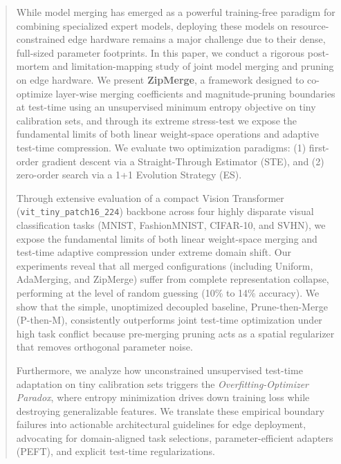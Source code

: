 \begin{abstract}
While model merging has emerged as a powerful training-free paradigm for combining specialized expert models, deploying these models on resource-constrained edge hardware remains a major challenge due to their dense, full-sized parameter footprints. In this paper, we conduct a rigorous post-mortem and limitation-mapping study of joint model merging and pruning on edge hardware. We present \textbf{ZipMerge}, a framework designed to co-optimize layer-wise merging coefficients and magnitude-pruning boundaries at test-time using an unsupervised minimum entropy objective on tiny calibration sets, and through its extreme stress-test we expose the fundamental limits of both linear weight-space operations and adaptive test-time compression. We evaluate two optimization paradigms: (1) first-order gradient descent via a Straight-Through Estimator (STE), and (2) zero-order search via a 1+1 Evolution Strategy (ES). 

Through extensive evaluation of a compact Vision Transformer (\texttt{vit\_tiny\_patch16\_224}) backbone across four highly disparate visual classification tasks (MNIST, FashionMNIST, CIFAR-10, and SVHN), we expose the fundamental limits of both linear weight-space merging and test-time adaptive compression under extreme domain shift. Our experiments reveal that all merged configurations (including Uniform, AdaMerging, and ZipMerge) suffer from complete representation collapse, performing at the level of random guessing (10\% to 14\% accuracy). We show that the simple, unoptimized decoupled baseline, Prune-then-Merge (P-then-M), consistently outperforms joint test-time optimization under high task conflict because pre-merging pruning acts as a spatial regularizer that removes orthogonal parameter noise. 

Furthermore, we analyze how unconstrained unsupervised test-time adaptation on tiny calibration sets triggers the \emph{Overfitting-Optimizer Paradox}, where entropy minimization drives down training loss while destroying generalizable features. We translate these empirical boundary failures into actionable architectural guidelines for edge deployment, advocating for domain-aligned task selections, parameter-efficient adapters (PEFT), and explicit test-time regularizations.
\end{abstract}
